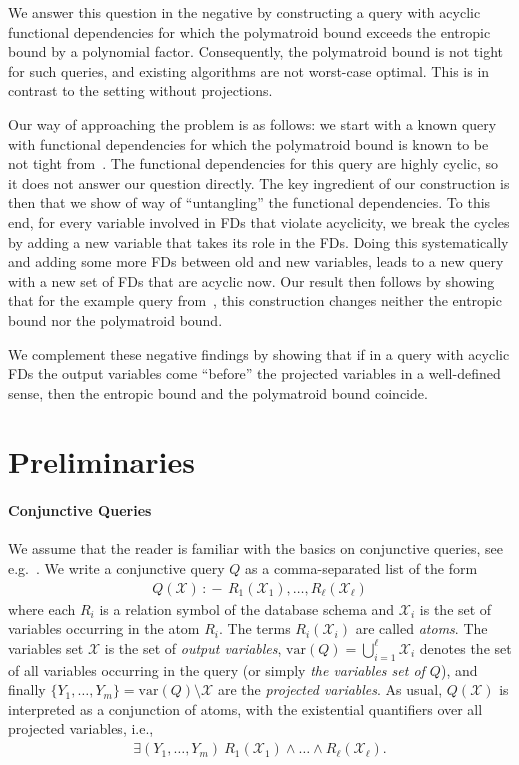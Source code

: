 \documentclass[a4paper,cleveref]{lipics-v2021}
\newcommand{\var}{\mathrm{var}}
\newcommand{\vset}[1]{\mathcal{#1}}
\newcommand{\datarule}{{\,:\!\!-\,}}
\begin{document}
We answer this question in the negative by constructing a query with acyclic functional dependencies for which the polymatroid bound exceeds the entropic bound by a polynomial factor. Consequently, the polymatroid bound is not tight for such queries, and existing algorithms are not worst-case optimal. This is in contrast to the setting without projections.

%

Our way of approaching the problem is as follows: we start with a known query with functional dependencies for which the polymatroid bound is known to be not tight from~\cite{Khamis0S16,Suciu23}. The functional dependencies for this query are highly cyclic, so it does not answer our question directly. The key ingredient of our construction is then that we show of way of ``untangling'' the functional dependencies. To this end, for every variable involved in FDs that violate acyclicity, we break the cycles by adding a new variable that takes its role in the FDs. Doing this systematically and adding some more FDs between old and new variables, leads to a new query with a new set of FDs that are acyclic now. Our result then follows by showing that for the example query from~\cite{Khamis0S17,Suciu23}, this construction changes neither the entropic bound nor the polymatroid bound.

We complement these negative findings by showing that if in a query with acyclic FDs the output variables come ``before'' the projected variables in a well-defined sense, then the entropic bound and the polymatroid bound coincide.

\section{Preliminaries}\label{sec:prelim}

\paragraph*{Conjunctive Queries}

We assume that the reader is familiar with the basics on conjunctive queries, see e.g.~\cite{ArenasBLMP21}. 
%
We write a conjunctive query $Q$ as a comma-separated list   of the form
%
\begin{align*}
	Q(\vset X) \datarule  R_1 (\vset X_1),  \ldots, R_\ell (\vset X_\ell) 
\end{align*}
where each $R_i$ is a relation symbol of the database schema and ${\vset X}_i $
is the set of variables occurring in the atom $R_i$. %
The terms $R_i(\vset X_i)$ are called \emph{atoms}.
The variables set $\vset X$ is the set of \emph{output variables}, $\var(Q) = \bigcup\limits_{i=1}^\ell \vset X_i$ denotes the set of all variables occurring in the query
(or simply \emph{the variables set of $Q$}), and finally $\{Y_1, \ldots, Y_m \} = \var(Q)\setminus \vset X$ are the \emph{projected variables}.
As usual, $Q(\vset X)$ is interpreted as a conjunction of atoms, with the existential quantifiers over all projected variables, i.e., 
\begin{align*}
	 \exists  (Y_1, \ldots, Y_m) \ R_1 (\vset X_1) \wedge  \ldots \wedge R_\ell (\vset X_\ell).
\end{align*}
\end{document}

